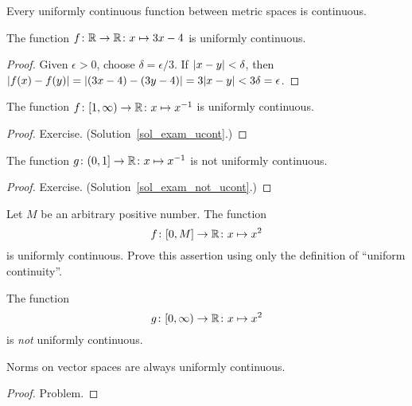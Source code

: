 \begin{prop}\label{prop_uc_cont}  Every uniformly continuous function between metric spaces is
continuous.
\end{prop}

\begin{exam}  The function $f \colon \mathbb{R} \rightarrow \mathbb{R} \colon x \mapsto 3x - 4$ is uniformly continuous.
\end{exam}

\begin{proof}  Given $\epsilon > 0$, choose $\delta = \epsilon/3$. If $\lvert x-y\rvert < \delta$, then
$\lvert f(x) - f(y)\rvert = \lvert(3x - 4) - (3y - 4)\rvert = 3\lvert x - y\rvert < 3\delta = \epsilon$.
\end{proof}


\begin{exam}\label{exam_ucont}  The function $f \colon [1,\infty) \rightarrow \mathbb{R} \colon x \mapsto x^{-1}$
is uniformly continuous.
\end{exam}

\begin{proof} Exercise. (Solution~\ref{sol_exam_ucont}.)   \ns  \end{proof}


\begin{exam}\label{exam_not_ucont}  The function $g \colon (0,1] \rightarrow \mathbb{R} \colon x \mapsto x^{-1}$
is not uniformly continuous.
\end{exam}

\begin{proof} Exercise.  (Solution~\ref{sol_exam_not_ucont}.)  \ns  \end{proof}

\begin{prob}  Let  $M$  be an arbitrary positive number.  The function
  \[ f\colon [0, M] \rightarrow \mathbb{R} \colon x \mapsto x^2 \]
is uniformly continuous.  Prove this assertion using only the definition of  ``uniform
continuity''.
\end{prob}

\begin{prob}   The function
  \[ g \colon [0,\infty) \rightarrow \mathbb{R} \colon x \mapsto x^2 \]
is \emph{not} uniformly continuous.
\end{prob}

\begin{prop} Norms on vector spaces are always uniformly continuous.
\end{prop}

\begin{proof}  Problem.   \ns  \end{proof}


